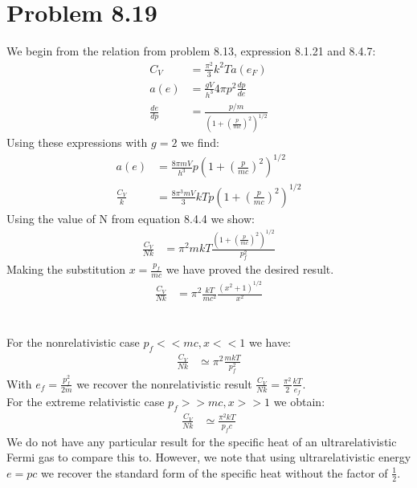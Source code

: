 \documentclass[a4paper,11pt]{article}
\numberwithin{equation}{section}
\begin{document}
\section{Problem 8.19}
We begin from the relation from problem 8.13, expression 8.1.21 and 8.4.7:
\begin{align}
 C_V &= \frac{\pi^2}{3}k^2Ta(e_F)\\
 a(e) &= \frac{gV}{h^3}4\pi p^2\frac{dp}{de}\\
 \frac{de}{dp} &= \frac{p/m}{\left(1+\left(\frac{p}{mc}\right)^2 \right)^{1/2}}
\end{align}
Using these expressions with $g=2$ we find:
\begin{align}
 a(e) &= \frac{8\pi mV}{h^3}p\left(1+\left(\frac{p}{mc}\right)^2 \right)^{1/2}\\
 \frac{C_V}{k} &= \frac{8\pi^3mV}{3}kTp\left(1+\left(\frac{p}{mc}\right)^2 \right)^{1/2}
\end{align}
Using the value of N from equation 8.4.4 we show:
\begin{align}
  \frac{C_V}{Nk} &= \pi^2mkT\frac{\left(1+\left(\frac{p}{mc}\right)^2 \right)^{1/2}}{p_f^2}
\end{align}
Making the substitution $x=\frac{p_f}{mc}$ we have proved the desired result.
\begin{align}
 \frac{C_V}{Nk} &= \pi^2\frac{kT}{mc^2}\frac{\left(x^2+1 \right)^{1/2}}{x^2}
\end{align}
\\ \\
For the nonrelativistic case $p_f<<mc,x<<1$ we have:
\begin{align}
 \frac{C_V}{Nk} &\simeq \pi^2\frac{mkT}{p_f^2}
\end{align}
With $e_f=\frac{p_f^2}{2m}$ we recover the nonrelativistic result $\frac{C_V}{Nk}=\frac{\pi^2}{2}\frac{kT}{e_f}$.
\\
For the extreme relativistic case $p_f>>mc, x>>1$ we obtain:
\begin{align}
 \frac{C_V}{Nk} &\simeq \frac{\pi^2kT}{p_f c}
\end{align}
We do not have any particular result for the specific heat of an ultrarelativistic Fermi gas to compare this to.
However, we note that using ultrarelativistic energy $e=pc$ we recover the standard form of the specific heat without the factor of $\frac{1}{2}$.
\end{document}
